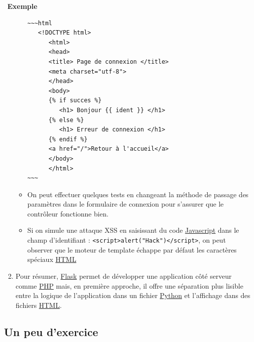 \documentclass[
  11pt,
]{article}
\newcommand{\passthrough}[1]{#1}
\newcounter{exple}
\newenvironment{exemple}[1]
{\par \medskip   \addtocounter{exple}{1} \noindent  
\begin{bclogo}[arrondi =0.1,   noborder = true, logo=\bclampe, marge=4]{~\textbf{Exemple} \textbf{\theexple} {\itshape #1} }  \par}
{
\end{bclogo}
 \par \bigskip }
\newcounter{logi}
\begin{document}
\begin{exemple}{}
\begin{enumerate}
\begin{itemize}
\begin{lstlisting}
~~~html
   <!DOCTYPE html>
      <html>
      <head>
      <title> Page de connexion </title>
      <meta charset="utf-8">   
      </head>  
      <body>   
      {% if succes %}
         <h1> Bonjour {{ ident }} </h1>
      {% else %}
         <h1> Erreur de connexion </h1>
      {% endif %}
      <a href="/">Retour à l'accueil</a>
      </body>
      </html> 
~~~
\end{lstlisting}
  \item
    On peut effectuer quelques tests en changeant la méthode de passage
    des paramètres dans le formulaire de connexion pour s'assurer que le
    contrôleur fonctionne bien.
  \item
    Si on simule une attaque XSS en saisissant du code
    \href{https://developer.mozilla.org/fr/docs/Glossaire/JavaScript}{Javascript}
    dans le champ d'identifiant :
    \passthrough{\lstinline!<script>alert("Hack")</script>!}, on peut
    observer que le moteur de template échappe par défaut les caractères
    spéciaux
    \href{https://developer.mozilla.org/fr/docs/Glossaire/HTML}{HTML}
  \end{itemize}
\item
  Pour résumer,
  \href{https://flask.palletsprojects.com/en/1.1.x/}{Flask} permet de
  développer une application côté serveur comme
  \href{https://developer.mozilla.org/fr/docs/Glossaire/PHP}{PHP} mais,
  en première approche, il offre une séparation plus lisible entre la
  logique de l'application dans un fichier
  \href{https://docs.python.org/3.7/library/cgi.html}{Python} et
  l'affichage dans des fichiers
  \href{https://developer.mozilla.org/fr/docs/Glossaire/HTML}{HTML}.
\end{enumerate}

\end{exemple}

\hypertarget{un-peu-dexercice}{%
\subsection{Un peu d'exercice}\label{un-peu-dexercice}}
\end{document}
